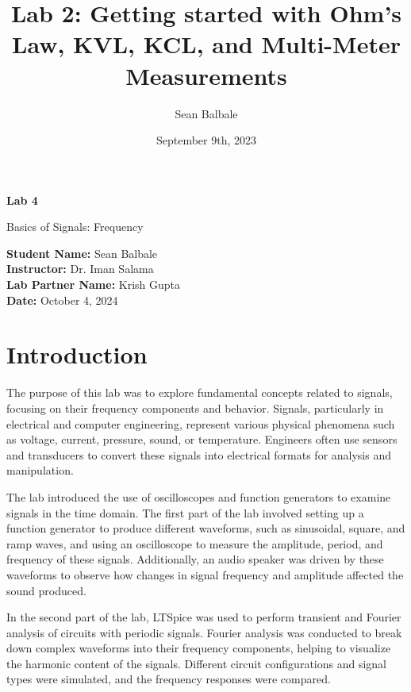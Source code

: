 \documentclass{article}
\title{Lab 2: Getting started with Ohm's Law, KVL, KCL, and Multi-Meter
Measurements}
\author{Sean Balbale}
\date{September 9th, 2023}
\begin{document}
\begin{titlepage}
	\begin{center}
		\vspace*{1in}

		\Huge
		\textbf{Lab 4}

		\LARGE
		Basics of Signals: Frequency

		\vspace{3 in}

		\textbf{Student Name:} Sean Balbale
		\\ \textbf{Instructor:} Dr. Iman Salama
		\\ \textbf{Lab Partner Name:} Krish Gupta
		\\ \textbf{Date:} October 4, 2024

		\vfill


	\end{center}
\end{titlepage}

\newpage


\section{Introduction}
The purpose of this lab was to explore fundamental concepts related to signals,
focusing on their frequency components and behavior. Signals, particularly in
electrical and computer engineering, represent various physical phenomena such
as voltage, current, pressure, sound, or temperature. Engineers often use
sensors and transducers to convert these signals into electrical formats for
analysis and manipulation.
\newline

The lab introduced the use of oscilloscopes and function generators to examine
signals in the time domain. The first part of the lab involved setting up a
function generator to produce different waveforms, such as sinusoidal, square,
and ramp waves, and using an oscilloscope to measure the amplitude, period, and
frequency of these signals. Additionally, an audio speaker was driven by these
waveforms to observe how changes in signal frequency and amplitude affected the
sound produced.
\newline

In the second part of the lab, LTSpice was used to perform transient and
Fourier analysis of circuits with periodic signals. Fourier analysis was
conducted to break down complex waveforms into their frequency components,
helping to visualize the harmonic content of the signals. Different circuit
configurations and signal types were simulated, and the frequency responses were
compared.
\newline
\end{document}
